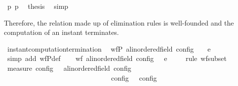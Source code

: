 \begin{isabellebody}
\ p{}\ p{}\ \isamarkupfalse%
\ {\isacharquery}thesis\ \isamarkupfalse%
\ simp\isanewline
{}\isamarkupfalse%
%
\endisatagproof
{\isafoldproof}%
%
\isadelimproof
%
\endisadelimproof
%
\begin{isamarkuptext}%
Therefore, the relation made up of elimination rules is well-founded and the
  computation of an instant terminates.%
\end{isamarkuptext}\isamarkuptrue%
\isamarkupfalse%
\ instant{\isacharunderscore}computation{\isacharunderscore}termination{\isacharcolon}\isanewline
\ \ {\isacartoucheopen}wfP\ {\isacharparenleft}{\isasymlambda}{\isacharparenleft}{\isasymS}a{\isacharcolon}{\isacharcolon}linordered{\isacharunderscore}field\ config{\isacharparenright}\ {\isasymS}\ {\isacharparenleft}{\isasymS}\ \ {\isasymhookrightarrow}\isactrlsub e\isactrlsup {\isasymleftarrow}\ \ {\isasymS}\isanewline
%
\isadelimproof
%
\endisadelimproof
%
\isatagproof
{}\isamarkupfalse%
\ {\isacharparenleft}simp\ add{\isacharcolon}\ wfP{\isacharunderscore}def{\isacharparenright}\isanewline
\ \ \isamarkupfalse%
\ {\isacartoucheopen}wf\ {\isacharbraceleft}{\isacharparenleft}{\isacharparenleft}{\isasymS}a{\isacharcolon}{\isacharcolon}linordered{\isacharunderscore}field\ config{\isacharparenright}{\isacharcomma}\ {\isasymS}\ {\isasymS}\ {\isasymhookrightarrow}\isactrlsub e\isactrlsup {\isasymleftarrow}\ {\isasymS}\isanewline
\ \ \isamarkupfalse%
\ {\isacharparenleft}rule\ wf{\isacharunderscore}subset{\isacharparenright}\isanewline
\ \ \ \ \isamarkupfalse%
\ {\isacartoucheopen}measure\ {\isasymmu}\isactrlsub c\isactrlsub o\isactrlsub n\isactrlsub f\isactrlsub i\isactrlsub g\ {\isacharequal}\ {\isacharbraceleft}{\isacharparenleft}{\isasymS}\ {\isacharparenleft}{\isasymS}a{\isacharcolon}{\isacharcolon}linordered{\isacharunderscore}field\ config{\isacharparenright}{\isacharparenright}{\isachardot}\isanewline
\ \ \ \ \ \ \ \ \ \ \ \ \ \ \ \ \ \ \ \ \ \ \ \ \ \ \ \ \ \ \ {\isasymmu}\isactrlsub c\isactrlsub o\isactrlsub n\isactrlsub f\isactrlsub i\isactrlsub g\ {\isasymS}\ {\isacharless}\ {\isasymmu}\isactrlsub c\isactrlsub o\isactrlsub n\isactrlsub f\isactrlsub i\isactrlsub g\ {\isasymS}\isanewline

\end{isabellebody}
